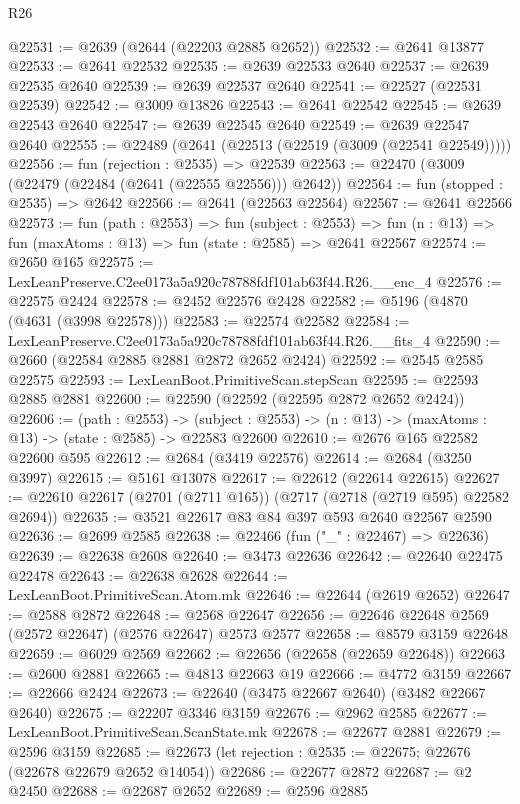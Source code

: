 \begin{lexlean}{R26}
\begin{coremodule}
@22531 := @2639 (@2644 (@22203 @2885 @2652))
@22532 := @2641 @13877
@22533 := @2641 @22532
@22535 := @2639 @22533 @2640
@22537 := @2639 @22535 @2640
@22539 := @2639 @22537 @2640
@22541 := @22527 (@22531 @22539)
@22542 := @3009 @13826
@22543 := @2641 @22542
@22545 := @2639 @22543 @2640
@22547 := @2639 @22545 @2640
@22549 := @2639 @22547 @2640
@22555 := @22489 (@2641 (@22513 (@22519 (@3009 (@22541 @22549)))))
@22556 := fun (rejection : @2535) => @22539
@22563 := @22470 (@3009 (@22479 (@22484 (@2641 (@22555 @22556))) @2642))
@22564 := fun (stopped : @2535) => @2642
@22566 := @2641 (@22563 @22564)
@22567 := @2641 @22566
@22573 := fun (path : @2553) =>
  fun (subject : @2553) =>
  fun (n : @13) => fun (maxAtoms : @13) => fun (state : @2585) => @2641 @22567
@22574 := @2650 @165
@22575 := LexLeanPreserve.C2ee0173a5a920c78788fdf101ab63f44.R26.__enc_4
@22576 := @22575 @2424
@22578 := @2452 @22576 @2428
@22582 := @5196 (@4870 (@4631 (@3998 @22578)))
@22583 := @22574 @22582
@22584 := LexLeanPreserve.C2ee0173a5a920c78788fdf101ab63f44.R26.__fits_4
@22590 := @2660 (@22584 @2885 @2881 @2872 @2652 @2424)
@22592 := @2545 @2585 @22575
@22593 := LexLeanBoot.PrimitiveScan.stepScan
@22595 := @22593 @2885 @2881
@22600 := @22590 (@22592 (@22595 @2872 @2652 @2424))
@22606 := (path : @2553) ->
  (subject : @2553) -> (n : @13) -> (maxAtoms : @13) -> (state : @2585) -> @22583 @22600
@22610 := @2676 @165 @22582 @22600 @595
@22612 := @2684 (@3419 @22576)
@22614 := @2684 (@3250 @3997)
@22615 := @5161 @13078
@22617 := @22612 (@22614 @22615)
@22627 := @22610 @22617 (@2701 (@2711 @165)) (@2717 (@2718 (@2719 @595) @22582 @2694))
@22635 := @3521 @22617 @83 @84 @397 @593 @2640 @22567 @2590
@22636 := @2699 @2585
@22638 := @22466 (fun ("_" : @22467) => @22636)
@22639 := @22638 @2608
@22640 := @3473 @22636
@22642 := @22640 @22475 @22478
@22643 := @22638 @2628
@22644 := LexLeanBoot.PrimitiveScan.Atom.mk
@22646 := @22644 (@2619 @2652)
@22647 := @2588 @2872
@22648 := @2568 @22647
@22656 := @22646 @22648 @2569 (@2572 @22647) (@2576 @22647) @2573 @2577
@22658 := @8579 @3159 @22648
@22659 := @6029 @2569
@22662 := @22656 (@22658 (@22659 @22648))
@22663 := @2600 @2881
@22665 := @4813 @22663 @19
@22666 := @4772 @3159
@22667 := @22666 @2424
@22673 := @22640 (@3475 @22667 @2640) (@3482 @22667 @2640)
@22675 := @22207 @3346 @3159
@22676 := @2962 @2585
@22677 := LexLeanBoot.PrimitiveScan.ScanState.mk
@22678 := @22677 @2881
@22679 := @2596 @3159
@22685 := @22673 (let rejection : @2535 := @22675; @22676 (@22678 @22679 @2652 @14054))
@22686 := @22677 @2872
@22687 := @2 @2450
@22688 := @22687 @2652
@22689 := @2596 @2885

\end{coremodule}
\end{lexlean}
